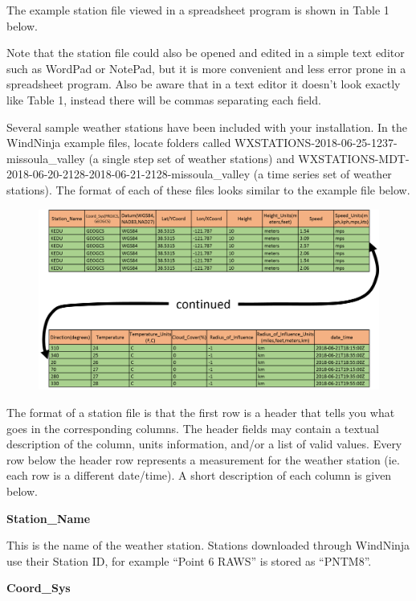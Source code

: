 \documentclass[12pt]{article}
\begin{document}
The example station file viewed in a spreadsheet program is shown in Table 1 below.

Note that the station file could also be opened and edited in a simple text editor such as WordPad or NotePad, but it is more convenient and less error prone in a spreadsheet program.  Also be aware that in a text editor it doesn't look exactly like Table 1, instead there will be commas separating each field.

Several sample weather stations have been included with your installation. In the WindNinja example files, locate folders called WXSTATIONS-2018-06-25-1237-missoula\_valley (a single step set of weather stations) and WXSTATIONS-MDT-2018-06-20-2128-2018-06-21-2128-missoula\_valley (a time series set of weather stations). The format of each of these files looks similar to the example file below.

\begin{landscape}
\begin{figure}[H]
	\centering
	\label{}
	\includegraphics[scale=0.9]{Table-1}
\end{figure}
\end{landscape}
The format of a station file is that the first row is a header that tells you what goes in the corresponding columns.  The header fields may contain a textual description of the column, units information, and/or a list of valid values.  Every row below the header row represents a measurement for the weather station (ie. each row is a different date/time).  A short description of each column is given below.

\textbf{Station\_Name}

This is the name of the weather station. Stations downloaded through WindNinja use their Station ID, for example “Point 6 RAWS” is stored as “PNTM8”.

\textbf{Coord\_Sys}
\end{document}
